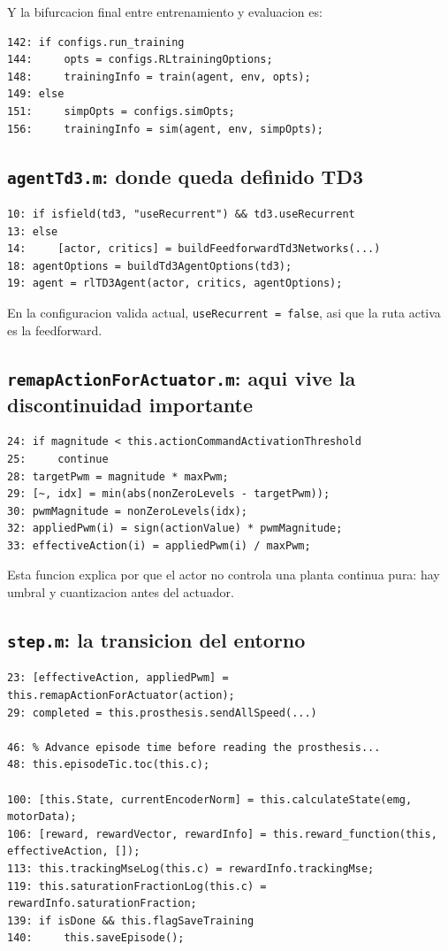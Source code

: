 \documentclass[11pt,a4paper]{article}
\begin{document}
Y la bifurcacion final entre entrenamiento y evaluacion es:

\begin{lstlisting}
142: if configs.run_training
144:     opts = configs.RLtrainingOptions;
148:     trainingInfo = train(agent, env, opts);
149: else
151:     simpOpts = configs.simOpts;
156:     trainingInfo = sim(agent, env, simpOpts);
\end{lstlisting}

\subsection{\texttt{agentTd3.m}: donde queda definido TD3}

\begin{lstlisting}
10: if isfield(td3, "useRecurrent") && td3.useRecurrent
13: else
14:     [actor, critics] = buildFeedforwardTd3Networks(...)
18: agentOptions = buildTd3AgentOptions(td3);
19: agent = rlTD3Agent(actor, critics, agentOptions);
\end{lstlisting}

En la configuracion valida actual, \texttt{useRecurrent = false}, asi que la ruta activa es la feedforward.

\subsection{\texttt{remapActionForActuator.m}: aqui vive la discontinuidad importante}

\begin{lstlisting}
24: if magnitude < this.actionCommandActivationThreshold
25:     continue
28: targetPwm = magnitude * maxPwm;
29: [~, idx] = min(abs(nonZeroLevels - targetPwm));
30: pwmMagnitude = nonZeroLevels(idx);
32: appliedPwm(i) = sign(actionValue) * pwmMagnitude;
33: effectiveAction(i) = appliedPwm(i) / maxPwm;
\end{lstlisting}

Esta funcion explica por que el actor no controla una planta continua pura: hay umbral y cuantizacion antes del actuador.

\subsection{\texttt{step.m}: la transicion del entorno}

\begin{lstlisting}
23: [effectiveAction, appliedPwm] = this.remapActionForActuator(action);
29: completed = this.prosthesis.sendAllSpeed(...)

46: % Advance episode time before reading the prosthesis...
48: this.episodeTic.toc(this.c);

100: [this.State, currentEncoderNorm] = this.calculateState(emg, motorData);
106: [reward, rewardVector, rewardInfo] = this.reward_function(this, effectiveAction, []);
113: this.trackingMseLog(this.c) = rewardInfo.trackingMse;
119: this.saturationFractionLog(this.c) = rewardInfo.saturationFraction;
139: if isDone && this.flagSaveTraining
140:     this.saveEpisode();
\end{lstlisting}
\end{document}
